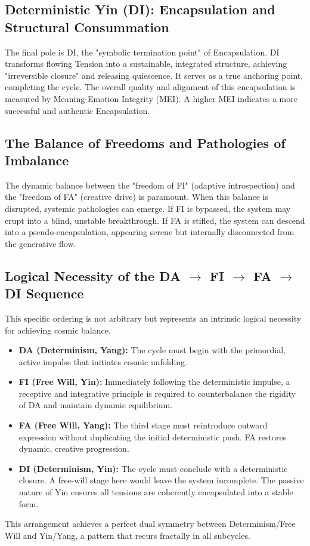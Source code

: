 \documentclass[11pt, a4paper]{article}
\begin{document}
\subsection{Deterministic Yin (DI): Encapsulation and Structural Consummation}
The final pole is DI, the "symbolic termination point" of Encapsulation. DI transforms flowing Tension into a sustainable, integrated structure, achieving "irreversible closure" and releasing quiescence. It serves as a true anchoring point, completing the cycle. The overall quality and alignment of this encapsulation is measured by Meaning-Emotion Integrity (MEI). A higher MEI indicates a more successful and authentic Encapsulation.

\subsection{The Balance of Freedoms and Pathologies of Imbalance}
The dynamic balance between the "freedom of FI" (adaptive introspection) and the "freedom of FA" (creative drive) is paramount. When this balance is disrupted, systemic pathologies can emerge. If FI is bypassed, the system may erupt into a blind, unstable breakthrough. If FA is stifled, the system can descend into a pseudo-encapsulation, appearing serene but internally disconnected from the generative flow.

\subsection{Logical Necessity of the DA $\rightarrow$ FI $\rightarrow$ FA $\rightarrow$ DI Sequence}
This specific ordering is not arbitrary but represents an intrinsic logical necessity for achieving cosmic balance.
\begin{itemize}
    \item \textbf{DA (Determinism, Yang):} The cycle must begin with the primordial, active impulse that initiates cosmic unfolding.
    \item \textbf{FI (Free Will, Yin):} Immediately following the deterministic impulse, a receptive and integrative principle is required to counterbalance the rigidity of DA and maintain dynamic equilibrium.
    \item \textbf{FA (Free Will, Yang):} The third stage must reintroduce outward expression without duplicating the initial deterministic push. FA restores dynamic, creative progression.
    \item \textbf{DI (Determinism, Yin):} The cycle must conclude with a deterministic closure. A free-will stage here would leave the system incomplete. The passive nature of Yin ensures all tensions are coherently encapsulated into a stable form.
\end{itemize}
This arrangement achieves a perfect dual symmetry between Determinism/Free Will and Yin/Yang, a pattern that recurs fractally in all subcycles.
\end{document}
